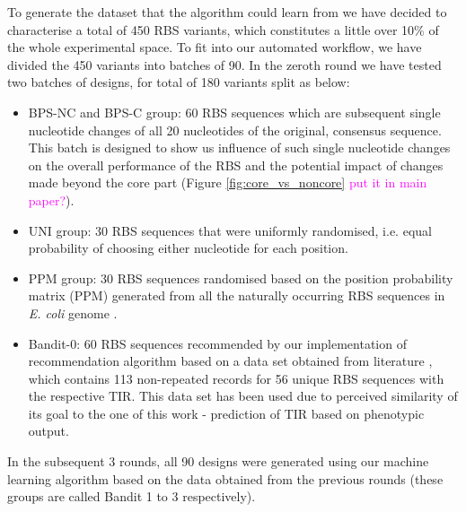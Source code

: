\documentclass{article}
\newcommand{\mengyan}[1]{\textcolor{magenta}{#1}}
\begin{document}
To generate the dataset that the algorithm could learn from we have decided to characterise a total of 450 RBS variants, which constitutes a little over 10\% of the whole experimental space. 
To fit into our automated workflow, we have divided the 450 variants into batches of 90.
In the zeroth round we have tested two batches of designs, for total of 180 variants split as below: 
\begin{itemize}
    \item BPS-NC and BPS-C group: 60 RBS sequences which are subsequent single nucleotide changes of all 20 nucleotides of the original, consensus sequence. This batch is designed to show us influence of such single nucleotide changes on the overall performance of the RBS and the potential impact of changes made beyond the core part (Figure \ref{fig:core_vs_noncore} \mengyan{put it in main paper?}).
    \item UNI group: 30 RBS sequences that were  uniformly randomised, i.e. equal probability of choosing either nucleotide for each position. 
    \item PPM group: 30 RBS sequences randomised based on the position probability matrix (PPM) generated from all the naturally occurring RBS sequences in \emph{E. coli} genome \cite{Stormo1982}.
    \item Bandit-0: 60 RBS sequences recommended by our implementation of recommendation algorithm based on a data set obtained from literature \cite{jervis2018machine}, which contains 113 non-repeated records for 56 unique RBS sequences with the respective TIR.
    This data set has been used due to perceived similarity of its goal to the one of this work - prediction of TIR based on phenotypic output.
\end{itemize}
In the subsequent 3 rounds, all 90 designs were generated using our machine learning algorithm based on the data obtained from the previous rounds (these groups are called Bandit 1 to 3 respectively).
\end{document}
